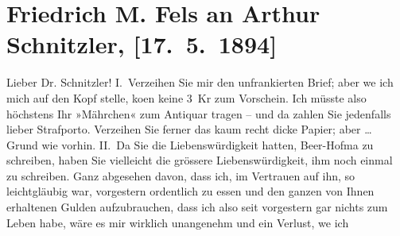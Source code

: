 

         
         \renewcommand{\erwaehntePersonen}{Personen:  ?? [Vermieterin], Richard Beer-Hofmann}
         \renewcommand{\erwaehnteInstitutionen}{Institutionen: Augartenfest}
         \renewcommand{\erwaehnteOrte}{Orte: Krütznergasse, Wien}
         \renewcommand{\erwaehnteWerke}{Werke: Das Märchen. Schauspiel in drei Aufzügen}
               \section[Friedrich M. Fels an Arthur Schnitzler, {[}17. 5. 1894{]}]{ Friedrich M. Fels an Arthur Schnitzler, {[}17. 5. 1894{]}}\nopagebreak{}\rehead{ }\begin{ledgroupsized}[t]{13cm}\normalsize\beginnumbering \toendnotes[C]{\smallbreak\pagebreak[2]} 
\toendnotes[C]{\smallbreak}\pstart{}{\pb}Lieber Dr. Schnitzler!\pend\pstart
           I. Verzeihen Sie mir den unfrankierten Brief; aber we{\geminationn}
               ich mich auf den Kopf stelle, ko{\geminationm}en keine 3 Kr zum
               Vorschein. Ich müsste also höchstens Ihr »Mährchen« zum Antiquar tragen – und da zahlen Sie jedenfalls lieber
               Strafporto. Verzeihen Sie ferner das kaum recht dicke Papier; aber {\dots} Grund wie vorhin.\pend
           \pstart
           II. Da Sie die Liebenswürdigkeit hatten, Beer-Hofma{\geminationn} zu schreiben, haben Sie vielleicht die grössere Liebenswürdigkeit, ihm noch
               einmal zu schreiben. Ganz abgesehen davon, dass ich, im Vertrauen auf ihn, so
               leichtgläubig war, vorgestern ordentlich zu essen und den ganzen von Ihnen erhaltenen
               Gulden aufzubrauchen, dass ich also seit vorgestern gar nichts zum Leben habe, wäre
               es mir wirklich unangenehm und ein Verlust, we{\geminationn} ich

\end{ledgroupsized}
